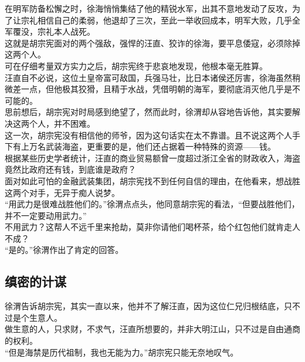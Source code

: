 \begin{multicols}{\theparacolNo}
在明军防备松懈之时，徐海悄悄集结了他的精锐水军，出其不意地发动了反攻，为了让宗礼相信自己的柔弱，他退却了三次，至此一举收回成本，明军大败，几乎全军覆没，宗礼本人战死。\\

这就是胡宗宪面对的两个强敌，强悍的汪直、狡诈的徐海，要平息倭寇，必须除掉这两个人。\\

可在仔细考量双方实力之后，胡宗宪终于悲哀地发现，他根本毫无胜算。\\

汪直自不必说，这位土皇帝富可敌国，兵强马壮，比日本诸侯还厉害，徐海虽然稍微差一点，但他极其狡猾，且精于水战，凭借明朝的海军，要彻底消灭他几乎是不可能的。\\

思前想后，胡宗宪对时局感到绝望了，然而此时，徐渭却从容地告诉他，其实要解决这两个人，并不困难。\\

这一次，胡宗宪没有相信他的师爷，因为这句话实在太不靠谱。且不说这两个人手下有上万名武装海盗，更重要的是，他们还占据着一种特殊的资源——钱。\\

根据某些历史学者统计，汪直的商业贸易额曾一度超过浙江全省的财政收入，海盗竟然比政府还有钱，到底谁是政府？\\

面对如此可怕的金融武装集团，胡宗宪找不到任何自信的理由，在他看来，想战胜这两个对手，无异于痴人说梦。\\

“用武力是很难战胜他们的。”徐渭点点头，他同意胡宗宪的看法，“但要战胜他们，并不一定要动用武力。”\\

不用武力？这帮人不远千里来抢劫，莫非你请他们喝杯茶，给个红包他们就肯走人不成？\\

“是的。”徐渭作出了肯定的回答。\\

\subsection{缜密的计谋}
徐渭告诉胡宗宪，其实一直以来，他并不了解汪直，因为这位仁兄归根结底，只不过是个生意人。\\

做生意的人，只求财，不求气，汪直所想要的，并非大明江山，只不过是自由通商的权利。\\

“但是海禁是历代祖制，我也无能为力。”胡宗宪只能无奈地叹气。\\


\end{multicols}
